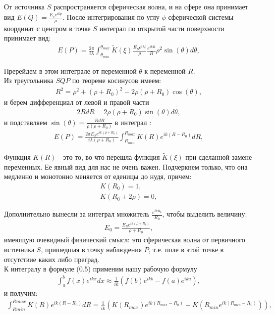 \documentclass[__main__.tex]{subfiles}
\begin{document}
От источника $S$ распространяется сферическая волна, и на сфере она принимает вид $E(Q)=\frac{E_s e^{ikp}}{\rho}$. После интегрирования по углу $\phi$ сферической системы координат с центром в точке $S$ интеграл по открытой части поверхности принимает вид:\\
\begin{gather}
	E(P)=\frac{2\pi}{i\lambda} \int_{\theta_{min}}^{\theta_{max}} \tilde{K} (\xi) \frac{E_S e^{ik\rho}}{\rho} \frac{e^{ikR}}{R} \rho^2 \sin(\theta) d\theta ,
\end{gather}

Пререйдем в этом интеграле от переменной $\theta$ к переменной $R$.\\
Из треугольника $SQP$ по теореме косинусов имеем:
\begin{gather}
	R^2 = \rho^2 + (\rho + R_0)^2 - 2\rho(\rho + R_0)\cos(\theta) ,
\end{gather}
и берем дифференциал от левой и правой части
\begin{gather}
	2RdR = 2\rho(\rho + R_0)\sin(\theta)d\theta ,
\end{gather}
и подставляем $\sin (\theta) = \frac{RdR}{\rho(\rho + R_0)}$ в интеграл :
\begin{gather}
	E(P) = \frac{2\pi E_S e^{ik(\rho + R_0)}}{i\lambda(\rho + R_0)} \int_{R_{min}}^{R_{max}} K(R)e^{ik(R-R_0)}dR ,
\end{gather}

Функция $K(R)$ - это то, во что перешла функция $\tilde{K}(\xi)$ при сделанной замене переменных. Ее явный вид для нас не очень важен. Подчеркнем только, что она медленно и монотонно меняется от еденицы до нудя, причем:
\begin{gather}
	K(R_0) = 1 , \\
	K(R_0+2\rho) = 0 ,
\end{gather}

Дополнительно вынесли за интеграл множитель $\frac{e^{ikR_0}}{R_0}$, чтобы выделить величину:
\begin{gather}
	E_0 = \frac{E_S e^{ik(\rho + R_0)}}{\rho + R_0} ,
\end{gather}
имеющую очевидный физический смысл: это сферическая волна от первичного источника $S$, пришедшая в точку наблюдения $P$, т.е. поле в этой точке в отсутствие каких либо преград.\\

К интегралу в формуле (0.5)
применим нашу рабочую формулу
\begin{gather}
	\int_{a}^{b} f(x)e^{ikx}dx \approx \frac{1}{ik} (f(b)e^{ikb} - f(a)e^{ika}) ,
\end{gather}
и получим:
\begin{gather}
	\int_{R{min}}^{R{max}} K(R)e^{ik(R-R_0)}dR = \frac{1}{ik}(K(R_{max})e^{ik(R_{max} - R_0)}-K(R_{min}e^{ik(R_{min} - R_0)})) ,
\end{gather}
\end{document}
